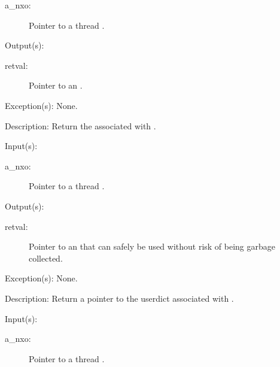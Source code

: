 \begin{capi}
\begin{capilist}
		\begin{description}\item[]
		\item[a\_nxo: ]
			Pointer to a thread .
		\end{description}
	\item[Output(s): ]
		\begin{description}\item[]
		\item[retval: ]
			Pointer to an .
		\end{description}
	\item[Exception(s): ] None.
	\item[Description: ]
		Return the  associated with .
	\end{capilist}
\label{nxo_thread_userdict_get}
	\begin{capilist}
	\item[Input(s): ]
		\begin{description}\item[]
		\item[a\_nxo: ]
			Pointer to a thread .
		\end{description}
	\item[Output(s): ]
		\begin{description}\item[]
		\item[retval: ]
			Pointer to an  that can safely be used
			without risk of being garbage collected.
		\end{description}
	\item[Exception(s): ] None.
	\item[Description: ]
		Return a pointer to the userdict associated with .
	\end{capilist}
\label{nxo_thread_errordict_get}
	\begin{capilist}
	\item[Input(s): ]
		\begin{description}\item[]
		\item[a\_nxo: ]
			Pointer to a thread \classname{nxo}.
		\end{description}

\end{capilist}
\end{capi}
